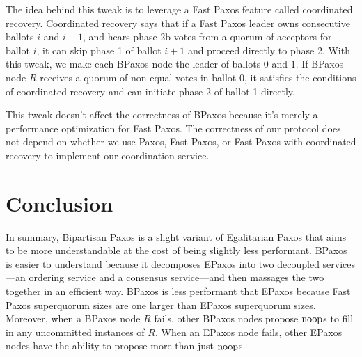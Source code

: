 \documentclass{mwhittaker}
\begin{document}
The idea behind this tweak is to leverage a Fast Paxos feature called
coordinated recovery. Coordinated recovery says that if a Fast Paxos leader
owns consecutive ballots $i$ and $i + 1$, and hears phase 2b votes from a
quorum of acceptors for ballot $i$, it can skip phase 1 of ballot $i + 1$ and
proceed directly to phase 2. With this tweak, we make each BPaxos node the
leader of ballots $0$ and $1$. If BPaxos node $R$ receives a quorum of
non-equal votes in ballot $0$, it satisfies the conditions of coordinated
recovery and can initiate phase 2 of ballot 1 directly.

This tweak doesn't affect the correctness of BPaxos because it's merely a
performance optimization for Fast Paxos. The correctness of our protocol does
not depend on whether we use Paxos, Fast Paxos, or Fast Paxos with coordinated
recovery to implement our coordination service.

\section{Conclusion}
In summary, Bipartisan Paxos is a slight variant of Egalitarian Paxos that aims
to be more understandable at the cost of being slightly less performant. BPaxos
is easier to understand because it decomposes EPaxos into two decoupled
services---an ordering service and a consensus service---and then massages the
two together in an efficient way. BPaxos is less performant that EPaxos because
Fast Paxos superquorum sizes are one larger than EPaxos superquorum sizes.
Moreover, when a BPaxos node $R$ fails, other BPaxos nodes propose $\text{noop}$s to
fill in any uncommitted instances of $R$. When an EPaxos node fails, other
EPaxos nodes have the ability to propose more than just $\text{noop}$s.



\end{document}
